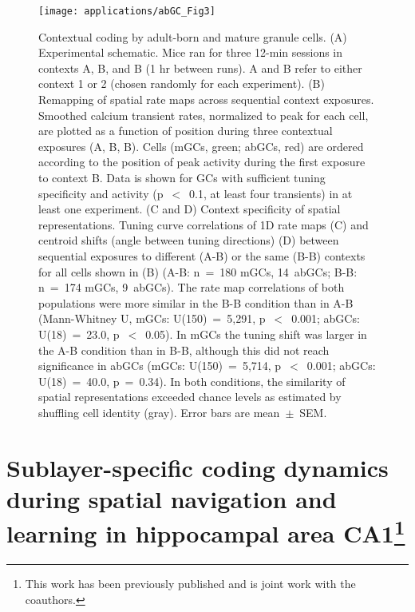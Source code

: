 \begin{figure}
	\centering
	\texttt{[image: applications/abGC\_Fig3]}
	\caption[Contextual coding by adult-born and mature granule cells]{Contextual coding by adult-born and mature granule cells.
	(A) Experimental schematic. Mice ran for three 12-min sessions in contexts A, B, and B (1 hr between runs). A and B refer to either context 1 or 2 (chosen randomly for each experiment).
	(B) Remapping of spatial rate maps across sequential context exposures. Smoothed calcium transient rates, normalized to peak for each cell, are plotted as a function of position during three contextual exposures (A, B, B). Cells (mGCs, green; abGCs, red) are ordered according to the position of peak activity during the first exposure to context B. Data is shown for GCs with sufficient tuning specificity and activity (p~$<$~0.1, at least four transients) in at least one experiment.
	(C and D) Context specificity of spatial representations. Tuning curve correlations of 1D rate maps (C) and centroid shifts (angle between tuning directions) (D) between sequential exposures to different (A-B) or the same (B-B) contexts for all cells shown in (B) (A-B: n~=~180 mGCs, 14~abGCs; B-B: n~=~174 mGCs, 9~abGCs). The rate map correlations of both populations were more similar in the B-B condition than in A-B (Mann-Whitney U, mGCs: U(150)~=~5,291, p~$<$~0.001; abGCs: U(18)~=~23.0, p~$<$~0.05). In mGCs the tuning shift was larger in the A-B condition than in B-B, although this did not reach significance in abGCs (mGCs: U(150)~=~5,714, p~$<$~0.001; abGCs: U(18)~=~40.0, p~=~0.34). In both conditions, the similarity of spatial representations exceeded chance levels as estimated by shuffling cell identity (gray).
	Error bars are mean~$\pm$~SEM.}
	\label{fig:other:dg:context}
\end{figure}

\section[Sublayer-specific coding dynamics during spatial navigation and learning in hippocampal area CA1]{Sublayer-specific coding dynamics during spatial navigation and learning in hippocampal area CA1\footnote{This work has been previously published \citep{Danielson2016b} and is joint work with the coauthors.}}
\label{sec:other:sf-deep}

